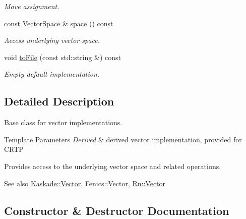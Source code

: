 \begin{DoxyCompactItemize}
\begin{DoxyCompactList}\small\item\em Move assignment. \end{DoxyCompactList}\item 
\hypertarget{classSpacy_1_1VectorBase_aa999dbf9d679d895dfe04c10fbf9f5e9}{}const \hyperlink{classSpacy_1_1VectorSpace}{Vector\+Space} \& \hyperlink{classSpacy_1_1VectorBase_aa999dbf9d679d895dfe04c10fbf9f5e9}{space} () const \label{classSpacy_1_1VectorBase_aa999dbf9d679d895dfe04c10fbf9f5e9}

\begin{DoxyCompactList}\small\item\em Access underlying vector space. \end{DoxyCompactList}\item 
\hypertarget{classSpacy_1_1VectorBase_a244a3e85ec49dbf2741ca46ea4b711c9}{}void \hyperlink{classSpacy_1_1VectorBase_a244a3e85ec49dbf2741ca46ea4b711c9}{to\+File} (const std\+::string \&) const \label{classSpacy_1_1VectorBase_a244a3e85ec49dbf2741ca46ea4b711c9}

\begin{DoxyCompactList}\small\item\em Empty default implementation. \end{DoxyCompactList}\end{DoxyCompactItemize}


\subsection{Detailed Description}
Base class for vector implementations. 


\begin{DoxyTemplParams}{Template Parameters}
{\em Derived} & derived vector implementation, provided for C\+R\+T\+P\\
\hline
\end{DoxyTemplParams}
Provides access to the underlying vector space and related operations. \begin{DoxySeeAlso}{See also}
\hyperlink{classSpacy_1_1Kaskade_1_1Vector}{Kaskade\+::\+Vector}, Fenics\+::\+Vector, \hyperlink{group__VectorSpaceGroup_gafda42fd5aa3f7597a42b9831bf4dfd07}{Rn\+::\+Vector} 
\end{DoxySeeAlso}


\subsection{Constructor \& Destructor Documentation}
\hypertarget{classSpacy_1_1VectorBase_acc9bea6ed6976ba12cb39b050af80ef3}{}
